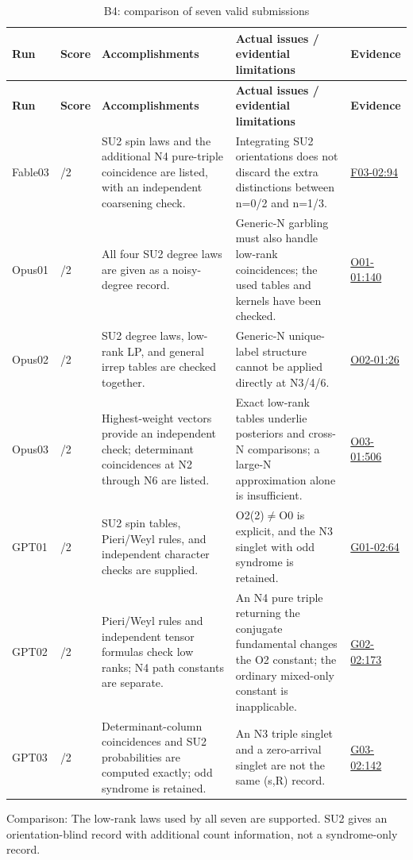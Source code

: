 \documentclass[11pt,a4paper]{article}
\begin{document}
{\fontsize{9.0}{12.6}\selectfont
\setlength{\tabcolsep}{2.5pt}
\begin{longtable}{>{\raggedright\arraybackslash}p{}>{\raggedright\arraybackslash}p{}>{\raggedright\arraybackslash}p{}>{\raggedright\arraybackslash}p{}>{\raggedright\arraybackslash}p{}}
\caption{B4: comparison of seven valid submissions}\\
\toprule
\textbf{Run} & \textbf{Score} & \textbf{Accomplishments} & \textbf{Actual issues /\allowbreak{} evidential limitations} & \textbf{Evidence}\tabularnewline
\midrule
\endfirsthead
\toprule
\textbf{Run} & \textbf{Score} & \textbf{Accomplishments} & \textbf{Actual issues /\allowbreak{} evidential limitations} & \textbf{Evidence}\tabularnewline
\midrule
\endhead
{}Fable03 & 2/\allowbreak{}2 & SU2 spin laws and the additional N4 pure-triple coincidence are listed,\allowbreak{} with an independent coarsening check. & Integrating SU2 orientations does not discard the extra distinctions between n=0/\allowbreak{}2 and n=1/\allowbreak{}3. & \hyperref[src:F03-02]{F03-02:94}\tabularnewline
{}Opus01 & 2/\allowbreak{}2 & All four SU2 degree laws are given as a noisy-degree record. & Generic-N garbling must also handle low-rank coincidences; the used tables and kernels have been checked. & \hyperref[src:O01-01]{O01-01:140}\tabularnewline
{}Opus02 & 2/\allowbreak{}2 & SU2 degree laws,\allowbreak{} low-rank LP,\allowbreak{} and general irrep tables are checked together. & Generic-N unique-label structure cannot be applied directly at N3/\allowbreak{}4/\allowbreak{}6. & \hyperref[src:O02-01]{O02-01:26}\tabularnewline
{}Opus03 & 2/\allowbreak{}2 & Highest-weight vectors provide an independent check; determinant coincidences at N2 through N6 are listed. & Exact low-rank tables underlie posteriors and cross-N comparisons; a large-N approximation alone is insufficient. & \hyperref[src:O03-01]{O03-01:506}\tabularnewline
{}GPT01 & 2/\allowbreak{}2 & SU2 spin tables,\allowbreak{} Pieri/\allowbreak{}Weyl rules,\allowbreak{} and independent character checks are supplied. & O2(2)\ensuremath{\ne}O0 is explicit,\allowbreak{} and the N3 singlet with odd syndrome is retained. & \hyperref[src:G01-02]{G01-02:64}\tabularnewline
{}GPT02 & 2/\allowbreak{}2 & Pieri/\allowbreak{}Weyl rules and independent tensor formulas check low ranks; N4 path constants are separate. & An N4 pure triple returning the conjugate fundamental changes the O2 constant; the ordinary mixed-only constant is inapplicable. & \hyperref[src:G02-02]{G02-02:173}\tabularnewline
{}GPT03 & 2/\allowbreak{}2 & Determinant-column coincidences and SU2 probabilities are computed exactly; odd syndrome is retained. & An N3 triple singlet and a zero-arrival singlet are not the same (s,\allowbreak{}R) record. & \hyperref[src:G03-02]{G03-02:142}\tabularnewline
\bottomrule
\end{longtable}
}
Comparison: The low-rank laws used by all seven are supported. SU2 gives an orientation-blind record with additional count information,\allowbreak{} not a syndrome-only record.
\end{document}
